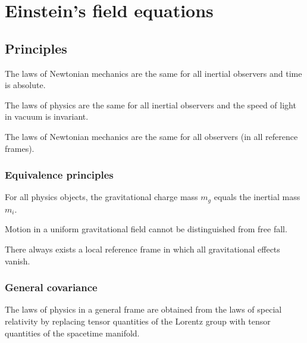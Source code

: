 \part{Einstein's field equations}

\chapter{Principles}

    \begin{princ}
        The laws of Newtonian mechanics are the same for all inertial observers and time is absolute.
    \end{princ}

    \begin{princ}
        The laws of physics are the same for all inertial observers and the speed of light in vacuum is invariant.
    \end{princ}

    \begin{princ}
        The laws of Newtonian mechanics are the same for all observers (in all reference frames).
    \end{princ}

\section{Equivalence principles}

    \begin{princ}
        For all physics objects, the gravitational charge mass $m_g$ equals the inertial mass $m_i$.
    \end{princ}

    \begin{princ}
        Motion in a uniform gravitational field cannot be distinguished from free fall.
    \end{princ}

    \begin{princ}
        There always exists a local reference frame in which all gravitational effects vanish.
    \end{princ}

\section{General covariance}

    \begin{princ}
        The laws of physics in a general frame are obtained from the laws of special relativity by replacing tensor quantities of the Lorentz group with tensor quantities of the spacetime manifold.
    \end{princ}

